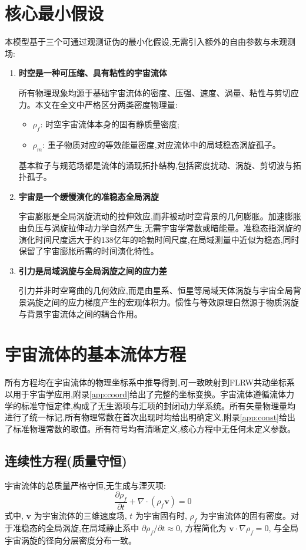\documentclass[11pt,a4paper]{article}
\def\grad{\nabla}
\begin{document}
\section{核心最小假设}
本模型基于三个可通过观测证伪的最小化假设,无需引入额外的自由参数与未观测场:

\begin{enumerate}
\item \textbf{时空是一种可压缩、具有粘性的宇宙流体}

所有物理现象均源于基础宇宙流体的密度、压强、速度、涡量、粘性与剪切应力。本文在全文中严格区分两类密度物理量:
\begin{itemize}
\item $\rho_f$: 时空宇宙流体本身的固有静质量密度;
\item $\rho_m$: 重子物质对应的等效能量密度,对应流体中的局域稳态涡旋孤子。
\end{itemize}
基本粒子与规范场都是流体的涌现拓扑结构,包括密度扰动、涡旋、剪切波与拓扑孤子。

\item \textbf{宇宙是一个缓慢演化的准稳态全局涡旋}

宇宙膨胀是全局涡旋流动的拉伸效应,而非被动时空背景的几何膨胀。加速膨胀由负压与涡旋拉伸动力学自然产生,无需宇宙学常数或暗能量。准稳态指涡旋的演化时间尺度远大于约138亿年的哈勃时间尺度,在局域测量中近似为稳态,同时保留了宇宙膨胀所需的时间演化特性。

\item \textbf{引力是局域涡旋与全局涡旋之间的应力差}

引力并非时空弯曲的几何效应,而是由星系、恒星等局域天体涡旋与宇宙全局背景涡旋之间的应力梯度产生的宏观体积力。惯性与等效原理自然源于物质涡旋与背景宇宙流体之间的耦合作用。
\end{enumerate}

\section{宇宙流体的基本流体方程}
所有方程均在宇宙流体的物理坐标系中推导得到,可一致映射到FLRW共动坐标系以用于宇宙学应用,附录\ref{app:coord}给出了完整的坐标变换。宇宙流体遵循流体力学的标准守恒定律,构成了无生源项与汇项的封闭动力学系统。所有矢量物理量均进行了统一标记,所有物理常数在首次出现时均给出明确定义,附录\ref{app:const}给出了标准物理常数的取值。所有符号均有清晰定义,核心方程中无任何未定义参数。

\subsection{连续性方程(质量守恒)}
宇宙流体的总质量严格守恒,无生成与湮灭项:
\begin{equation}
\frac{\partial \rho_f}{\partial t} + \grad \cdot (\rho_f \boldsymbol{v}) = 0
\end{equation}
式中, $\boldsymbol{v}$ 为宇宙流体的三维速度场, $t$ 为宇宙固有时, $\rho_f$ 为宇宙流体的固有密度。对于准稳态的全局涡旋,在局域静止系中 $\partial \rho_f / \partial t \approx 0$, 方程简化为 $\boldsymbol{v} \cdot \grad \rho_f = 0$, 与全局宇宙涡旋的径向分层密度分布一致。
\end{document}
